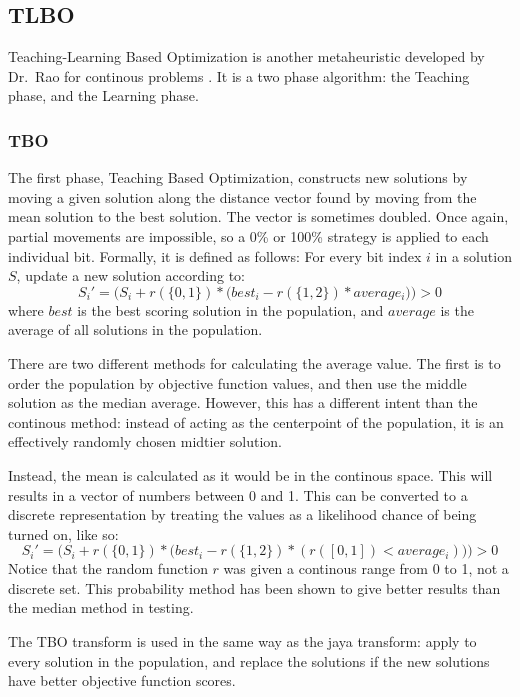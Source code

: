 \documentclass[11pt, letterpaper, onecolumn]{article}
\begin{document}
\subsection{TLBO}

Teaching-Learning Based Optimization is another metaheuristic developed by Dr.~Rao for continous problems %
. It is a two phase algorithm: the Teaching phase, and the Learning phase.

\subsubsection{TBO}

The first phase, Teaching Based Optimization, constructs new solutions by moving a given solution along the distance vector found by moving from the mean solution to the best solution. The vector is sometimes doubled. Once again, partial movements are impossible, so a 0\% or 100\% strategy is applied to each individual bit. Formally, it is defined as follows: For every bit index $i$ in a solution $S$, update a new solution according to: 
\begin{equation}
S_i' = \Big(S_i + r(\{0, 1\})*\big(best_i - r(\{1, 2\})*average_i\big)\Big) > 0
\end{equation}
where $best$ is the best scoring solution in the population, and $average$ is the average of all solutions in the population. 

There are two different methods for calculating the average value. The first is to order the population by objective function values, and then use the middle solution as the median average. However, this has a different intent than the continous method: instead of acting as the centerpoint of the population, it is an effectively randomly chosen midtier solution. 

Instead, the mean is calculated as it would be in the continous space. This will results in a vector of numbers between 0 and 1. This can be converted to a discrete representation by treating the values as a likelihood chance of being turned on, like so: 
\begin{equation}
S_i' = \Big(S_i + r(\{0, 1\})*\big(best_i - r(\{1, 2\})*(r([0, 1]) < average_i)\big)\Big) > 0
\end{equation}
Notice that the random function $r$ was given a continous range from 0 to 1, not a discrete set. This probability method has been shown to give better results than the median method in testing. 

The TBO transform is used in the same way as the jaya transform: apply to every solution in the population, and replace the solutions if the new solutions have better objective function scores.
\end{document}
